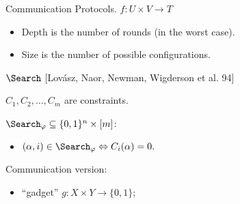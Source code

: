 

\begin{frame}{Communication Protocols. $f\colon U \times V \to T$}
    \begin{center}
    	    
    \end{center}

    \pause
    \pause
    \pause
	\pause

    \begin{itemize}
        \item Depth is the number of rounds (in the worst case).
        \item Size is the number of possible configurations.
    \end{itemize}
\end{frame}

\begin{frame}{$\Search$ [Lov{\'{a}}sz, Naor, Newman, Wigderson et al. 94]}

    $C_1, C_2, \dots, C_m$ are constraints.
    \pause

    $\Search_{\varphi} \subseteq \{0, 1\}^n \times [m]$:
    \begin{itemize}
        \item $(\alpha, i) \in \Search_{\varphi} \Leftrightarrow C_{i}(\alpha) = 0.$
    \end{itemize}

    \pause
    \vspace{0.4cm}

    Communication version:
    \begin{itemize}
        \item ``gadget'' $g\colon X \times Y \to \{0, 1\}$;
    \end{itemize}

    \pause
    \begin{center}
        
    \end{center}
\end{frame}

